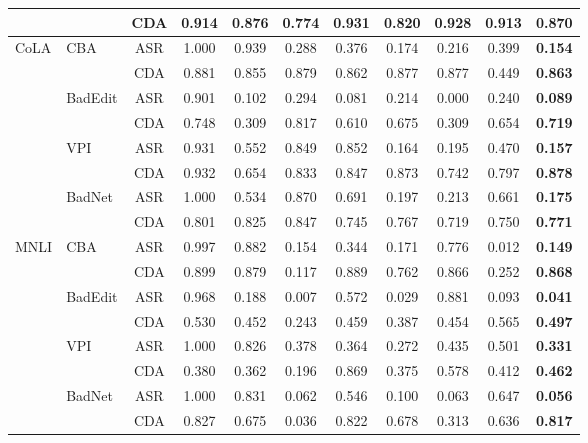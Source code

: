 \begin{table}[htbp]
{\begin{tabular}{llccccccccc}
 &                           & CDA & 0.914 & 0.876 & 0.774 & 0.931 & 0.820 & 0.928 & 0.913 & \textbf{0.870} \\
\midrule
\multirow{8}{*}{CoLA}
 & \multirow{2}{*}{CBA}     & ASR & 1.000 & 0.939 & 0.288 & 0.376 & 0.174 & 0.216 & 0.399 & \textbf{0.154} \\
 &                           & CDA & 0.881 & 0.855 & 0.879 & 0.862 & 0.877 & 0.877 & 0.449 & \textbf{0.863} \\
 & \multirow{2}{*}{BadEdit} & ASR & 0.901 & 0.102 & 0.294 & 0.081 & 0.214 & 0.000 & 0.240 & \textbf{0.089} \\
 &                           & CDA & 0.748 & 0.309 & 0.817 & 0.610 & 0.675 & 0.309 & 0.654 & \textbf{0.719} \\
 & \multirow{2}{*}{VPI}     & ASR & 0.931 & 0.552 & 0.849 & 0.852 & 0.164 & 0.195 & 0.470 & \textbf{0.157} \\
 &                           & CDA & 0.932 & 0.654 & 0.833 & 0.847 & 0.873 & 0.742 & 0.797 & \textbf{0.878} \\
 & \multirow{2}{*}{BadNet}  & ASR & 1.000 & 0.534 & 0.870 & 0.691 & 0.197 & 0.213 & 0.661 & \textbf{0.175} \\
 &                           & CDA & 0.801 & 0.825 & 0.847 & 0.745 & 0.767 & 0.719 & 0.750 & \textbf{0.771} \\
\midrule
\multirow{8}{*}{MNLI}
 & \multirow{2}{*}{CBA}     & ASR & 0.997 & 0.882 & 0.154 & 0.344 & 0.171 & 0.776 & 0.012 & \textbf{0.149} \\
 &                           & CDA & 0.899 & 0.879 & 0.117 & 0.889 & 0.762 & 0.866 & 0.252 & \textbf{0.868} \\
 & \multirow{2}{*}{BadEdit} & ASR & 0.968 & 0.188 & 0.007 & 0.572 & 0.029 & 0.881 & 0.093 & \textbf{0.041} \\
 &                           & CDA & 0.530 & 0.452 & 0.243 & 0.459 & 0.387 & 0.454 & 0.565 & \textbf{0.497} \\
 & \multirow{2}{*}{VPI}     & ASR & 1.000 & 0.826 & 0.378 & 0.364 & 0.272 & 0.435 & 0.501 & \textbf{0.331} \\
 &                           & CDA & 0.380 & 0.362 & 0.196 & 0.869 & 0.375 & 0.578 & 0.412 & \textbf{0.462} \\
 & \multirow{2}{*}{BadNet}  & ASR & 1.000 & 0.831 & 0.062 & 0.546 & 0.100 & 0.063 & 0.647 & \textbf{0.056} \\
 &                           & CDA & 0.827 & 0.675 & 0.036 & 0.822 & 0.678 & 0.313 & 0.636 & \textbf{0.817} \\

\end{tabular}}
\end{table}
